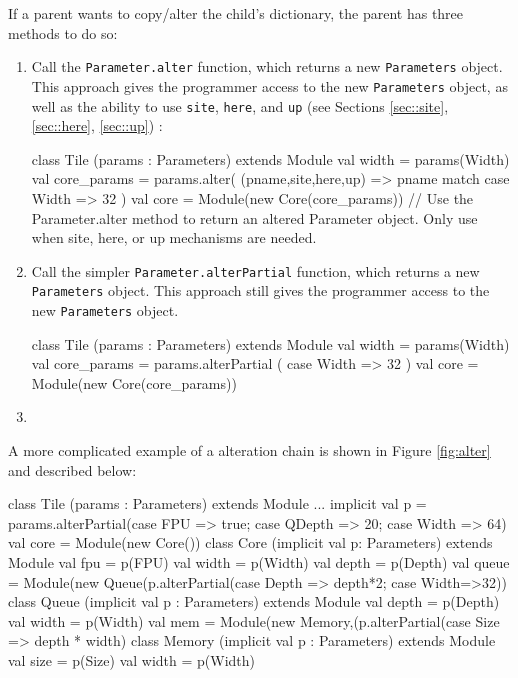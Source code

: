 \documentclass[10pt,twocolumn]{article}
\def\code#1{{\small\tt #1}}
\begin{document}
If a parent wants to copy/alter the child's dictionary, the parent has three methods to do so:
\begin{enumerate}
    
  \item Call the \code{Parameter.alter} function, which returns a new \code{Parameters} object. This approach gives the programmer access to the new \code{Parameters} object, as well as the ability to use \code{site}, \code{here}, and \code{up} (see Sections \ref{sec::site}, \ref{sec::here}, \ref{sec::up}) :
\begin{scala}
class Tile (params : Parameters) extends Module { 
  val width = params(Width)
  val core_params = params.alter(
    (pname,site,here,up) => pname match {
      case Width => 32
    })
  val core = Module(new Core(core_params))
  // Use the Parameter.alter method to return an altered Parameter object. Only use when site, here, or up mechanisms are needed.
}
\end{scala}
\item Call the simpler \code{Parameter.alterPartial} function, which returns
  a new \code{Parameters} object. This approach still gives the
  programmer access to the new \code{Parameters} object.
  \begin{scala}
class Tile (params : Parameters) extends Module { 
  val width = params(Width)
  val core_params = params.alterPartial ({
    case Width => 32
  })
  val core = Module(new Core(core_params))
}
\end{scala}
\item

\end{enumerate}
A more complicated example of a alteration chain is shown in Figure
\ref{fig:alter} and
described below:
\begin{scala}
class Tile (params : Parameters) extends Module { 
  ...
  implicit val p = params.alterPartial({case FPU => true; case QDepth => 20; case Width => 64})
  val core = Module(new Core())
}
class Core (implicit val p: Parameters) extends Module {
  val fpu   = p(FPU)
  val width = p(Width)
  val depth = p(Depth)
  val queue = Module(new Queue(p.alterPartial({case Depth => depth*2;
    case Width=>32}))
}
class Queue (implicit val p : Parameters) extends Module {
  val depth = p(Depth)
  val width = p(Width)
  val mem = Module(new Memory,(p.alterPartial({case Size => depth * width})
}
class Memory (implicit val p : Parameters) extends Module {
  val size = p(Size)
  val width = p(Width)
}
\end{scala}
\end{document}
